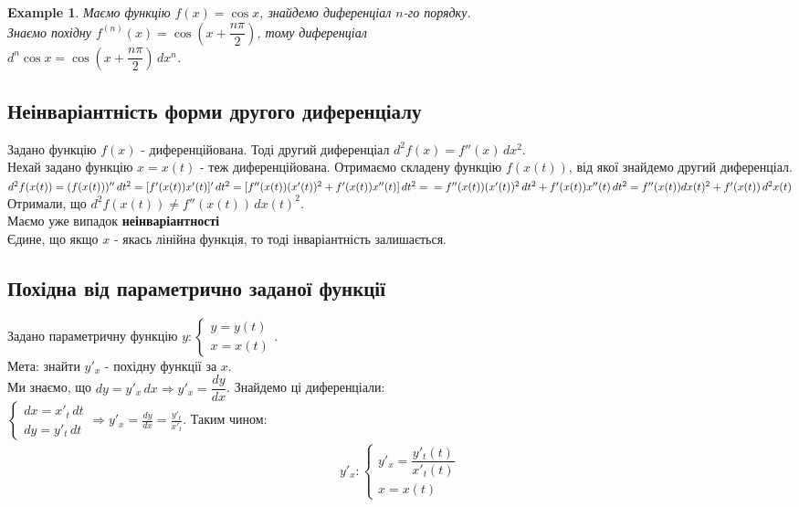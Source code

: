 \documentclass[a4paper, 14pt]{article}
\def\huge{\displaystyle}
\theoremstyle{theoremdd}
\theoremstyle{theoremdd}
\theoremstyle{theoremdd}
\theoremstyle{theoremdd}
\newtheorem{example}[theorem]{Example}
\theoremstyle{theoremdd}
\theoremstyle{theoremdd}
\theoremstyle{theoremdd}
\theoremstyle{theoremdd}
\begin{document}
\begin{example}
Маємо функцію $f(x) = \cos x$, знайдемо диференціал $n$-го порядку.\\
Знаємо похідну $f^{(n)}(x) = \cos \left(x + \dfrac{n \pi}{2} \right)$, тому диференціал\\
$d^n \cos x = \cos \left(x + \dfrac{n \pi}{2} \right) \,dx^n$.
\end{example}

\subsection{Неінваріантність форми другого диференціалу}
Задано функцію $f(x)$ - диференційована. Тоді другий диференціал $d^2f(x) = f''(x)\,dx^2$.\\
Нехай задано функцію $x = x(t)$ - теж диференційована. Отримаємо складену функцію $f(x(t))$, від якої знайдемо другий диференціал.\\
$d^2 f(x(t)) = (f(x(t)))'' \,dt^2 = [f'(x(t))x'(t)]'\,dt^2 = [f''(x(t))(x'(t))^2 + f'(x(t))x''(t)]\,dt^2 = \\ 
= f''(x(t))(x'(t))^2\,dt^2 + f'(x(t))x''(t)\,dt^2 = f''(x(t)) dx(t)^2 + f'(x(t))\,d^2 x(t)$\\
Отримали, що $d^2f(x(t)) \neq f''(x(t))\,dx(t)^2$.\\
Маємо уже випадок \textbf{неінваріантності} \\ Єдине, що якщо $x$ - якась лінійна функція, то тоді інваріантність залишається.

\subsection{Похідна від параметрично заданої функції}
Задано параметричну функцію $y: \begin{cases} y = y(t) \\ x = x(t) \end{cases}$.\\
Мета: знайти $y'_x$ - похідну функції за $x$.\\
Ми знаємо, що $dy = y'_x \,dx \Rightarrow y'_x = \dfrac{dy}{dx}$. Знайдемо ці диференціали:\\
$\begin{cases} dx = x'_t\,dt \\ dy = y'_t\,dt \end{cases} \Rightarrow \huge y'_x = \frac{dy}{dx} = \frac{y'_t}{x'_t}$. Таким чином:
\begin{align*}
y'_x: \begin{cases} y'_x = \dfrac{y'_t(t)}{x'_t(t)} \\ x = x(t) \end{cases}
\end{align*}
\end{document}

